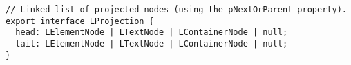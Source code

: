 \begin{verbatim}
// Linked list of projected nodes (using the pNextOrParent property).
export interface LProjection {
  head: LElementNode | LTextNode | LContainerNode | null;
  tail: LElementNode | LTextNode | LContainerNode | null;
}
\end{verbatim}
